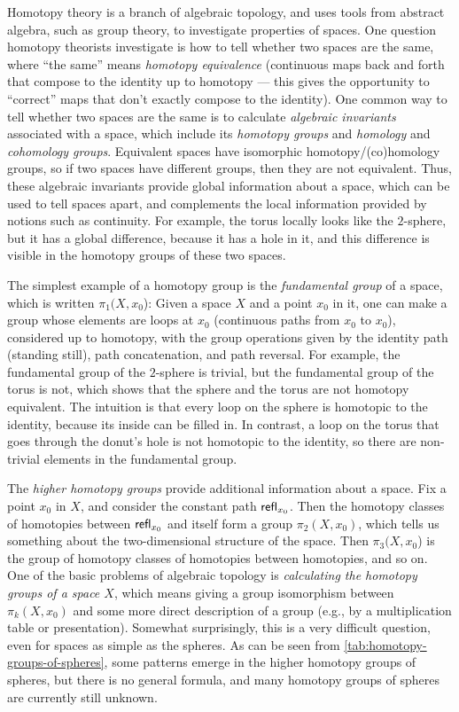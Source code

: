 %
Homotopy theory is a branch of algebraic topology, and uses tools from abstract algebra,
such as group theory, to investigate properties of spaces.  One question
homotopy theorists investigate is how to tell whether two spaces are the
same, where ``the same'' means \emph{homotopy equivalence}
%
(continuous
maps back and forth that compose to the identity up to homotopy --- this
gives the opportunity to ``correct'' maps that don't exactly compose to
the identity).  One common way to tell whether two spaces are the same
is to calculate \emph{algebraic invariants} associated with a space,
which include its \emph{homotopy groups} and \emph{homology} and
\emph{cohomology groups}.
%
%
Equivalent spaces have isomorphic
homotopy/(co)homology groups, so if two spaces have different groups,
then they are not equivalent.  Thus, these algebraic invariants provide
global information about a space, which can be used to tell spaces
apart, and complements the local information provided by notions such as
continuity.  For example, the torus locally looks like the $2$-sphere, but it
has a global difference, because it has a hole in it, and this difference
is visible in the homotopy groups of these two spaces.

The simplest example of a homotopy group is the \emph{fundamental group}
%
of a space, which is written $\pi_1(X,x_0$): Given a space $X$ and a
point $x_0$ in it, one can make a group whose elements are loops at
$x_0$ (continuous paths from $x_0$ to $x_0$), considered up to homotopy, with the
group operations given by the identity path (standing still), path
concatenation, and path reversal.  For example, the fundamental group of
the $2$-sphere is trivial, but the fundamental group of the torus is not,
which shows that the sphere and the torus are not homotopy equivalent.
The intuition is that every loop on the sphere is homotopic to the
identity, because its inside can be filled in.  In contrast, a loop on
the torus that goes through the donut's hole is not homotopic to the
identity, so there are non-trivial elements in the fundamental group.

The \emph{higher homotopy groups} provide additional information about a
space.  Fix a point $x_0$ in $X$, and consider the constant path
$\mathsf{refl}_{x_0}$.  Then the homotopy classes of homotopies between $\mathsf{refl}_{x_0}$
and itself form a group $\pi_2(X,x_0)$, which tells us something about
the two-dimensional structure of the space.  Then $\pi_3(X,x_0$) is the
group of homotopy classes of homotopies between homotopies, and so on.
One of the basic problems of algebraic topology  is
\emph{calculating the homotopy groups of a space $X$}, which means
giving a group isomorphism between $\pi_k(X,x_0)$ and some more direct
description of a group (e.g., by a multiplication table or
presentation).  Somewhat surprisingly, this is a very difficult
question, even for spaces as simple as the spheres.  As can be seen from
\cref{tab:homotopy-groups-of-spheres}, some patterns emerge in the
higher homotopy groups of spheres, but there is no general formula, and
many homotopy groups of spheres are currently still unknown.

